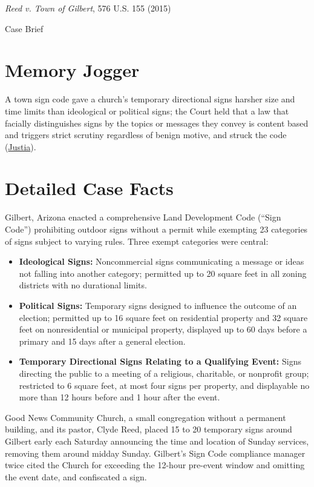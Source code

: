 \documentclass[12pt]{article}
\begin{document}
\begin{center}
{\LARGE \textit{Reed v. Town of Gilbert}, 576 U.S. 155 (2015)\par}
\vspace{0.8em}
{\large Case Brief\par}
\end{center}
\vspace{1em}

\section{Memory Jogger}
A town sign code gave a church's temporary directional signs harsher size and time limits than ideological or political signs; the Court held that a law that facially distinguishes signs by the topics or messages they convey is content based and triggers strict scrutiny regardless of benign motive, and struck the code (\href{https://supreme.justia.com/cases/federal/us/576/155/}{Justia}).

\section{Detailed Case Facts}
Gilbert, Arizona enacted a comprehensive Land Development Code (``Sign Code'') prohibiting outdoor signs without a permit while exempting 23 categories of signs subject to varying rules. Three exempt categories were central:
\begin{itemize}
  \item \textbf{Ideological Signs:} Noncommercial signs communicating a message or ideas not falling into another category; permitted up to 20 square feet in all zoning districts with no durational limits.
  \item \textbf{Political Signs:} Temporary signs designed to influence the outcome of an election; permitted up to 16 square feet on residential property and 32 square feet on nonresidential or municipal property, displayed up to 60 days before a primary and 15 days after a general election.
  \item \textbf{Temporary Directional Signs Relating to a Qualifying Event:} Signs directing the public to a meeting of a religious, charitable, or nonprofit group; restricted to 6 square feet, at most four signs per property, and displayable no more than 12 hours before and 1 hour after the event.
\end{itemize}

Good News Community Church, a small congregation without a permanent building, and its pastor, Clyde Reed, placed 15 to 20 temporary signs around Gilbert early each Saturday announcing the time and location of Sunday services, removing them around midday Sunday. Gilbert's Sign Code compliance manager twice cited the Church for exceeding the 12-hour pre-event window and omitting the event date, and confiscated a sign.
\end{document}
